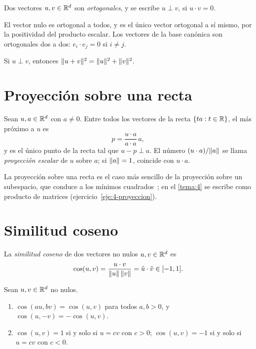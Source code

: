 \begin{definicion}[Ortogonalidad]
Dos vectores $u,v\in\mathbb{R}^{d}$ son \emph{ortogonales}, y se escribe $u\perp v$, si $u\cdot v=0$.
\end{definicion}

El vector nulo es ortogonal a todos, y es el único vector ortogonal a sí mismo, por la positividad del producto escalar. Los vectores de la base canónica son ortogonales dos a dos: $e_i\cdot e_j=0$ si $i\neq j$.

\begin{teorema}[Pitágoras]\label{teo:pitagoras}
Si $u\perp v$, entonces $\lVert u+v\rVert^{2}=\lVert u\rVert^{2}+\lVert v\rVert^{2}$.
\end{teorema}

\section{Proyección sobre una recta}

\begin{proposicion}\label{prop:proyeccion}
Sean $u,a\in\mathbb{R}^{d}$ con $a\neq 0$. Entre todos los vectores de la recta $\{ta: t\in\mathbb{R}\}$, el más próximo a $u$ es
\[
p=\frac{u\cdot a}{a\cdot a}\,a,
\]
y es el único punto de la recta tal que $u-p\perp a$. El número $(u\cdot a)/\lVert a\rVert$ se llama \emph{proyección escalar} de $u$ sobre $a$; si $\lVert a\rVert=1$, coincide con $u\cdot a$.
\end{proposicion}

\addtocounter{figure}{1}%

\addtocounter{definicion}{1}%

La proyección sobre una recta es el caso más sencillo de la proyección sobre un subespacio, que conduce a los mínimos cuadrados~\cite[§4.2]{strang}; en el \cref{tema:4} se escribe como producto de matrices (ejercicio~\ref{eje:4-proyeccion}).

\section{Similitud coseno}

\begin{definicion}\label{def:coseno}
La \emph{similitud coseno} de dos vectores no nulos $u,v\in\mathbb{R}^{d}$ es
\[
\cos(u,v)=\frac{u\cdot v}{\lVert u\rVert\,\lVert v\rVert}=\hat u\cdot\hat v\in[-1,1].
\]
\end{definicion}

\begin{proposicion}\label{prop:coseno}
Sean $u,v\in\mathbb{R}^{d}$ no nulos.
\begin{enumerate}
  \item $\cos(au,bv)=\cos(u,v)$ para todos $a,b>0$, y $\cos(u,-v)=-\cos(u,v)$.
  \item $\cos(u,v)=1$ si y solo si $u=cv$ con $c>0$; $\cos(u,v)=-1$ si y solo si $u=cv$ con $c<0$.
\end{enumerate}
\end{proposicion}

